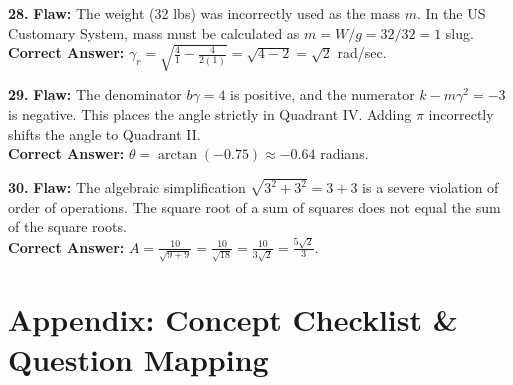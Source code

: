 \documentclass[11pt]{article}
\begin{document}
\vspace{0.5cm}
\textbf{28.} \textbf{Flaw:} The weight (32 lbs) was incorrectly used as the mass $m$. In the US Customary System, mass must be calculated as $m = W/g = 32/32 = 1$ slug. \\
\textbf{Correct Answer:} $\gamma_r = \sqrt{\frac{4}{1} - \frac{4}{2(1)}} = \sqrt{4 - 2} = \sqrt{2}$ rad/sec.

\vspace{0.5cm}
\textbf{29.} \textbf{Flaw:} The denominator $b\gamma = 4$ is positive, and the numerator $k-m\gamma^2 = -3$ is negative. This places the angle strictly in Quadrant IV. Adding $\pi$ incorrectly shifts the angle to Quadrant II. \\
\textbf{Correct Answer:} $\theta = \arctan(-0.75) \approx -0.64$ radians.

\vspace{0.5cm}
\textbf{30.} \textbf{Flaw:} The algebraic simplification $\sqrt{3^2 + 3^2} = 3 + 3$ is a severe violation of order of operations. The square root of a sum of squares does not equal the sum of the square roots. \\
\textbf{Correct Answer:} $A = \frac{10}{\sqrt{9 + 9}} = \frac{10}{\sqrt{18}} = \frac{10}{3\sqrt{2}} = \frac{5\sqrt{2}}{3}$.

\newpage

\section*{Appendix: Concept Checklist \& Question Mapping}
\end{document}
